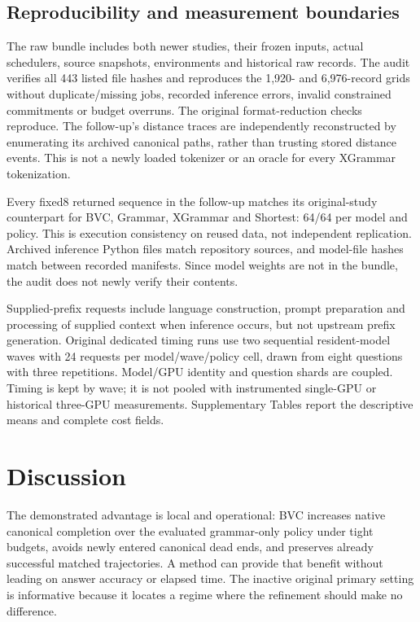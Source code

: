 \documentclass[12pt,a4paper]{article}
\begin{document}
\subsection{Reproducibility and measurement boundaries}\label{sec:repro}
The raw bundle includes both newer studies, their frozen inputs, actual schedulers, source snapshots, environments and historical raw records. The audit verifies all 443 listed file hashes and reproduces the 1,920- and 6,976-record grids without duplicate/missing jobs, recorded inference errors, invalid constrained commitments or budget overruns. The original format-reduction checks reproduce. The follow-up's distance traces are independently reconstructed by enumerating its archived canonical paths, rather than trusting stored distance events. This is not a newly loaded tokenizer or an oracle for every XGrammar tokenization.

Every fixed8 returned sequence in the follow-up matches its original-study counterpart for BVC, Grammar, XGrammar and Shortest: 64/64 per model and policy. This is execution consistency on reused data, not independent replication. Archived inference Python files match repository sources, and model-file hashes match between recorded manifests. Since model weights are not in the bundle, the audit does not newly verify their contents.

Supplied-prefix requests include language construction, prompt preparation and processing of supplied context when inference occurs, but not upstream prefix generation. Original dedicated timing runs use two sequential resident-model waves with 24 requests per model/wave/policy cell, drawn from eight questions with three repetitions. Model/GPU identity and question shards are coupled. Timing is kept by wave; it is not pooled with instrumented single-GPU or historical three-GPU measurements. Supplementary Tables report the descriptive means and complete cost fields.

\section{Discussion}\label{sec:discussion}
The demonstrated advantage is local and operational: BVC increases native canonical completion over the evaluated grammar-only policy under tight budgets, avoids newly entered canonical dead ends, and preserves already successful matched trajectories. A method can provide that benefit without leading on answer accuracy or elapsed time. The inactive original primary setting is informative because it locates a regime where the refinement should make no difference.
\end{document}
